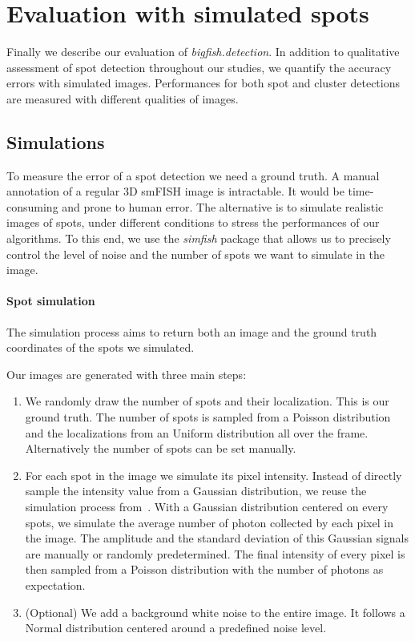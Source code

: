 \section{Evaluation with simulated spots} \label{sec:detection_evaluation}

Finally we describe our evaluation of \emph{bigfish.detection}.
In addition to qualitative assessment of spot detection throughout our studies, we quantify the accuracy errors with simulated images.
Performances for both spot and cluster detections are measured with different qualities of images.

\subsection{Simulations} \label{subsec:simulation}

To measure the error of a spot detection we need a ground truth.
A manual annotation of a regular 3D \ac{smFISH} image is intractable.
It would be time-consuming and prone to human error.
The alternative is to simulate realistic images of spots, under different conditions to stress the performances of our algorithms.
To this end, we use the \emph{simfish} package that allows us to precisely control the level of noise and the number of spots we want to simulate in the image.

\paragraph{Spot simulation}

The simulation process aims to return both an image and the ground truth coordinates of the spots we simulated.

\noindent
Our images are generated with three main steps:

\begin{enumerate}
	\item We randomly draw the number of spots and their localization.
	This is our ground truth.
	The number of spots is sampled from a Poisson distribution and the localizations from an Uniform distribution all over the frame.
	Alternatively the number of spots can be set manually.
	\item For each spot in the image we simulate its pixel intensity.
	Instead of directly sample the intensity value from a Gaussian distribution, we reuse the simulation process from~\cite{bahry_rs-fish_2021}.
	With a Gaussian distribution centered on every spots, we simulate the average number of photon collected by each pixel in the image.
	The amplitude and the standard deviation of this Gaussian signals are manually or randomly predetermined.
	The final intensity of every pixel is then sampled from a Poisson distribution with the number of photons as expectation.
	\item (Optional) We add a background white noise to the entire image.
	It follows a Normal distribution centered around a predefined noise level.
\end{enumerate}

